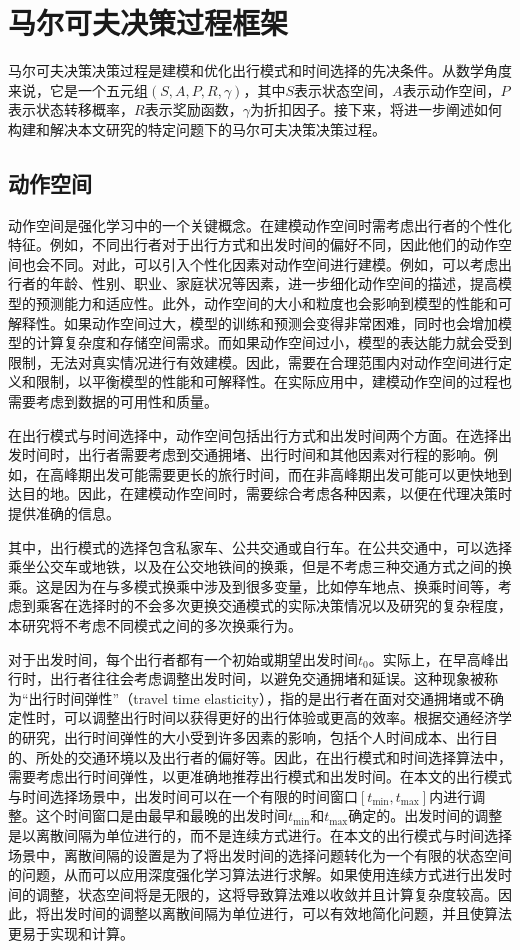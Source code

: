 \section{马尔可夫决策过程框架}
马尔可夫决策决策过程是建模和优化出行模式和时间选择的先决条件。从数学角度来说，它是一个五元组$(S, A, P, R, \gamma)$，其中$S$表示状态空间，$A$表示动作空间，$P$表示状态转移概率，$R$表示奖励函数，$\gamma$为折扣因子。接下来，将进一步阐述如何构建和解决本文研究的特定问题下的马尔可夫决策决策过程。



\subsection{动作空间}

动作空间是强化学习中的一个关键概念。在建模动作空间时需考虑出行者的个性化特征。例如，不同出行者对于出行方式和出发时间的偏好不同，因此他们的动作空间也会不同。对此，可以引入个性化因素对动作空间进行建模。例如，可以考虑出行者的年龄、性别、职业、家庭状况等因素，进一步细化动作空间的描述，提高模型的预测能力和适应性。此外，动作空间的大小和粒度也会影响到模型的性能和可解释性。如果动作空间过大，模型的训练和预测会变得非常困难，同时也会增加模型的计算复杂度和存储空间需求。而如果动作空间过小，模型的表达能力就会受到限制，无法对真实情况进行有效建模。因此，需要在合理范围内对动作空间进行定义和限制，以平衡模型的性能和可解释性。在实际应用中，建模动作空间的过程也需要考虑到数据的可用性和质量。

在出行模式与时间选择中，动作空间包括出行方式和出发时间两个方面。在选择出发时间时，出行者需要考虑到交通拥堵、出行时间和其他因素对行程的影响。例如，在高峰期出发可能需要更长的旅行时间，而在非高峰期出发可能可以更快地到达目的地。因此，在建模动作空间时，需要综合考虑各种因素，以便在代理决策时提供准确的信息。

其中，出行模式的选择包含私家车、公共交通或自行车。在公共交通中，可以选择乘坐公交车或地铁，以及在公交地铁间的换乘，但是不考虑三种交通方式之间的换乘。这是因为在与多模式换乘中涉及到很多变量，比如停车地点、换乘时间等，考虑到乘客在选择时的不会多次更换交通模式的实际决策情况以及研究的复杂程度，本研究将不考虑不同模式之间的多次换乘行为。

对于出发时间，每个出行者都有一个初始或期望出发时间$t_0$。实际上，在早高峰出行时，出行者往往会考虑调整出发时间，以避免交通拥堵和延误。这种现象被称为“出行时间弹性”（travel time elasticity），指的是出行者在面对交通拥堵或不确定性时，可以调整出行时间以获得更好的出行体验或更高的效率。根据交通经济学的研究，出行时间弹性的大小受到许多因素的影响，包括个人时间成本、出行目的、所处的交通环境以及出行者的偏好等。因此，在出行模式和时间选择算法中，需要考虑出行时间弹性，以更准确地推荐出行模式和出发时间。在本文的出行模式与时间选择场景中，出发时间可以在一个有限的时间窗口$[t_{\min},t_{\max}]$内进行调整。这个时间窗口是由最早和最晚的出发时间$t_{\min}$和$t_{\max}$确定的。出发时间的调整是以离散间隔为单位进行的，而不是连续方式进行。在本文的出行模式与时间选择场景中，离散间隔的设置是为了将出发时间的选择问题转化为一个有限的状态空间的问题，从而可以应用深度强化学习算法进行求解。如果使用连续方式进行出发时间的调整，状态空间将是无限的，这将导致算法难以收敛并且计算复杂度较高。因此，将出发时间的调整以离散间隔为单位进行，可以有效地简化问题，并且使算法更易于实现和计算。

